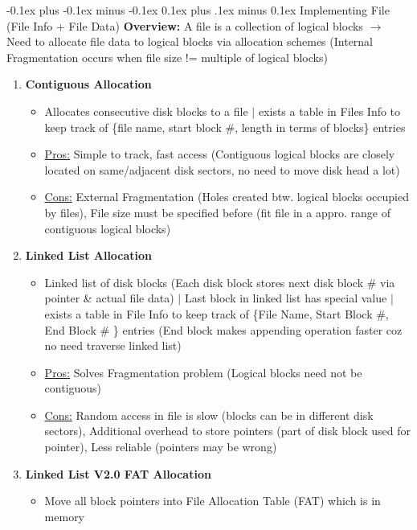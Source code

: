 \documentclass[landscape]{article}
\makeatletter
\renewcommand{\subsection}{\@startsection{subsection}{2}{0mm}%
  {-0.1ex plus -0.1ex minus -0.1ex}%
  {0.1ex plus .1ex minus 0.1ex}%
{\normalfont\scriptsize\bfseries}}
\makeatother
\begin{document}
\begin{multicols*}{6}
    \subsection{Implementing File (File Info + File Data)}
    \textbf{Overview:} A file is a collection of logical blocks $\rightarrow$ Need to allocate file data to logical blocks via allocation schemes (Internal Fragmentation occurs when file size != multiple of logical blocks)
    \begin{enumerate}
      \item \textbf{Contiguous Allocation}
      \begin{itemize}
        \item Allocates consecutive disk blocks to a file $\vert$ exists a table in Files Info to keep track of \{file name, start block \#, length in terms of blocks\} entries
        \item \underline{Pros:} Simple to track, fast access (Contiguous logical blocks are closely located on same/adjacent disk sectors, no need to move disk head a lot)
        \item \underline{Cons:} External Fragmentation (Holes created btw. logical blocks occupied by files), File size must be specified before (fit file in a appro. range of contiguous logical blocks)
      \end{itemize}
      \item \textbf{Linked List Allocation}
      \begin{itemize}
        \item Linked list of disk blocks (Each disk block stores next disk block \# via pointer \& actual file data) $\vert$ Last block in linked list has special value $\vert$ exists a table in File Info to keep track of \{File Name, Start Block \#, End Block \# \} entries (End block makes appending operation faster coz no need traverse linked list)
        \item \underline{Pros:} Solves Fragmentation problem (Logical blocks need not be contiguous)
        \item \underline{Cons:} Random access in file is slow (blocks can be in different disk sectors), Additional overhead to store pointers (part of disk block used for pointer), Less reliable (pointers may be wrong)
      \end{itemize}
      \item \textbf{Linked List V2.0 FAT Allocation}
      \begin{itemize}
        \item Move all block pointers into File Allocation Table (FAT) which is in memory 

\end{itemize}
\end{enumerate}
\end{multicols*}
\end{document}
